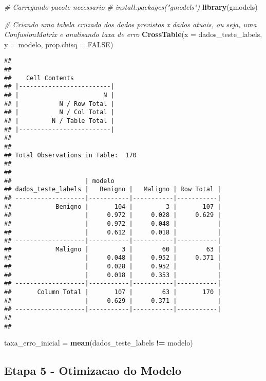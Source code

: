 \documentclass[]{article}
\newenvironment{Shaded}{\begin{snugshade}}{\end{snugshade}}
\newcommand{\KeywordTok}[1]{\textcolor[rgb]{0.13,0.29,0.53}{\textbf{#1}}}
\newcommand{\DataTypeTok}[1]{\textcolor[rgb]{0.13,0.29,0.53}{#1}}
\newcommand{\StringTok}[1]{\textcolor[rgb]{0.31,0.60,0.02}{#1}}
\newcommand{\CommentTok}[1]{\textcolor[rgb]{0.56,0.35,0.01}{\textit{#1}}}
\newcommand{\OtherTok}[1]{\textcolor[rgb]{0.56,0.35,0.01}{#1}}
\newcommand{\OperatorTok}[1]{\textcolor[rgb]{0.81,0.36,0.00}{\textbf{#1}}}
\newcommand{\NormalTok}[1]{#1}
\begin{document}
\begin{Shaded}
\begin{Highlighting}[]
\CommentTok{# Carregando pacote necessario}
\CommentTok{# install.packages("gmodels")}
\KeywordTok{library}\NormalTok{(gmodels)}

\CommentTok{# Criando uma tabela cruzada dos dados previstos x dados atuais, ou seja, uma ConfusionMatrix e analisando taxa de erro}
\KeywordTok{CrossTable}\NormalTok{(}\DataTypeTok{x =}\NormalTok{ dados_teste_labels, }\DataTypeTok{y =}\NormalTok{ modelo, }\DataTypeTok{prop.chisq =} \OtherTok{FALSE}\NormalTok{)}
\end{Highlighting}
\end{Shaded}

\begin{verbatim}
## 
##  
##    Cell Contents
## |-------------------------|
## |                       N |
## |           N / Row Total |
## |           N / Col Total |
## |         N / Table Total |
## |-------------------------|
## 
##  
## Total Observations in Table:  170 
## 
##  
##                    | modelo 
## dados_teste_labels |   Benigno |   Maligno | Row Total | 
## -------------------|-----------|-----------|-----------|
##            Benigno |       104 |         3 |       107 | 
##                    |     0.972 |     0.028 |     0.629 | 
##                    |     0.972 |     0.048 |           | 
##                    |     0.612 |     0.018 |           | 
## -------------------|-----------|-----------|-----------|
##            Maligno |         3 |        60 |        63 | 
##                    |     0.048 |     0.952 |     0.371 | 
##                    |     0.028 |     0.952 |           | 
##                    |     0.018 |     0.353 |           | 
## -------------------|-----------|-----------|-----------|
##       Column Total |       107 |        63 |       170 | 
##                    |     0.629 |     0.371 |           | 
## -------------------|-----------|-----------|-----------|
## 
## 
\end{verbatim}

\begin{Shaded}
\begin{Highlighting}[]
\NormalTok{taxa_erro_inicial =}\StringTok{ }\KeywordTok{mean}\NormalTok{(dados_teste_labels }\OperatorTok{!=}\StringTok{ }\NormalTok{modelo)}
\end{Highlighting}
\end{Shaded}

\subsection{Etapa 5 - Otimizacao do
Modelo}\label{etapa-5---otimizacao-do-modelo}
\end{document}
